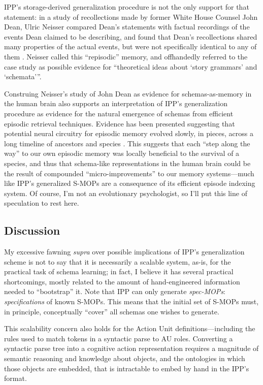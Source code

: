 IPP's storage-derived generalization procedure is not the only support for that statement: in a study of recollections made by former White House Counsel John Dean, Ulric Neisser compared Dean's statements with factual recordings of the events Dean claimed to be describing, and found that Dean's recollections shared many properties of the actual events, but were not specifically identical to any of them \citep{repisodic}. Neisser called this ``repisodic'' memory, and offhandedly referred to the case study as possible evidence for ``theoretical ideas about `story grammars' and `schemata'{}''.

Construing Neisser's study of John Dean as evidence for schemas-as-memory in the human brain also supports an interpretation of IPP's generalization procedure as evidence for the natural emergence of schemas from efficient episodic retrieval techniques. Evidence has been presented suggesting that potential neural circuitry for episodic memory evolved slowly, in pieces, across a long timeline of ancestors and species \citep{allen2013evolution}. This suggests that each ``step along the way'' to our own episodic memory was locally beneficial to the survival of a species, and thus that schema-like representations in the human brain could be the result of compounded ``micro-improvements'' to our memory systems---much like IPP's generalized S-MOPs are a consequence of its efficient episode indexing system. Of course, I'm not an evolutionary psychologist, so I'll put this line of speculation to rest here.

\subsection{Discussion}
My excessive fawning \textit{supra} over possible implications of IPP's generalization scheme is not to say that it is necessarily a scalable system, as-is, for the practical task of schema learning; in fact, I believe it has several practical shortcomings, mostly related to the amount of hand-engineered information needed to ``bootstrap'' it. Note that IPP can only generate \textit{spec-MOPs}: \textit{specifications} of known S-MOPs. This means that the initial set of S-MOPs must, in principle, conceptually ``cover'' all schemas one wishes to generate.

This scalability concern also holds for the Action Unit definitions---including the rules used to match tokens in a syntactic parse to AU roles. Converting a syntactic parse tree into a cognitive action representation requires a magnitude of semantic reasoning and knowledge about objects, and the ontologies in which those objects are embedded, that is intractable to embed by hand in the IPP's format.

